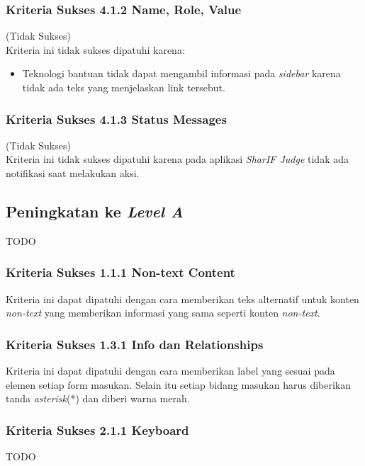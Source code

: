 \subsubsection{Kriteria Sukses 4.1.2 Name, Role, Value}
\label{subsubsec:kepatuhan_kriteria_4.1.2}
(Tidak Sukses) \\

Kriteria ini tidak sukses dipatuhi karena: 
\begin{itemize}
	\item Teknologi bantuan tidak dapat mengambil informasi pada \textit{sidebar} karena tidak ada teks yang menjelaskan link tersebut.
\end{itemize}

\subsubsection{Kriteria Sukses 4.1.3 Status Messages}
\label{subsubsec:kepatuhan_kriteria_4.1.3}
(Tidak Sukses) \\

Kriteria ini tidak sukses dipatuhi karena pada aplikasi \textit{SharIF Judge} tidak ada notifikasi saat melakukan aksi.

\subsection{Peningkatan ke \textit{Level A}}
\label{subsec:peningkatan_level_A}
TODO

\subsubsection{Kriteria Sukses 1.1.1 Non-text Content}
\label{subsubsec:peningkatan_A_1.1.1}

Kriteria ini dapat dipatuhi dengan cara memberikan teks alternatif untuk konten \textit{non-text} yang memberikan informasi yang sama seperti konten \textit{non-text}.

\subsubsection{Kriteria Sukses 1.3.1 Info dan Relationships}
\label{subsubsec:peningkatan_A_1.3.1}

Kriteria ini dapat dipatuhi dengan cara memberikan label yang sesuai pada elemen setiap form masukan. Selain itu setiap bidang masukan harus diberikan tanda \textit{asterisk}(*) dan diberi warna merah.

\subsubsection{Kriteria Sukses 2.1.1 Keyboard}
\label{subsubsec:peningkatan_A_2.1.1}
TODO

